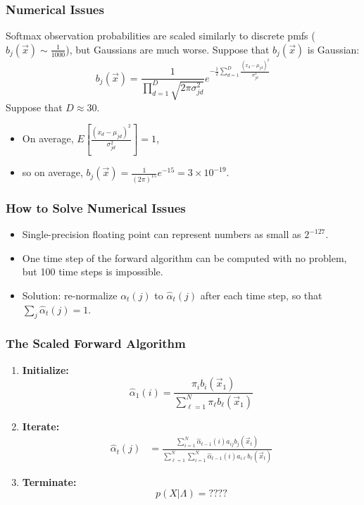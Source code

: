 \documentclass{beamer}
\begin{document}
\begin{frame}
  \frametitle{Numerical Issues}

  Softmax observation probabilities are scaled similarly to discrete
  pmfs ($b_j(\vec{x})\sim\frac{1}{1000}$), but Gaussians are much
  worse. Suppose that $b_j(\vec{x})$ is Gaussian:
  \begin{displaymath}
    b_j(\vec{x})=
    \frac{1}{\prod_{d=1}^D\sqrt{2\pi\sigma_{jd}^2}}e^{-\frac{1}{2}\sum_{d=1}^D\frac{(x_d-\mu_{jd})^2}{\sigma_{jd}^2}}
  \end{displaymath}
  Suppose that $D\approx 30$.
  \begin{itemize}
  \item On average, $E\left[\frac{(x_d-\mu_{jd})^2}{\sigma_{jd}^2}\right]=1$,
  \item so  on average, $b_j(\vec{x})=\frac{1}{(2\pi)^{15}}e^{-15}=3\times 10^{-19}$.
  \end{itemize}
\end{frame}

\begin{frame}
  \frametitle{How to Solve Numerical Issues}

  \begin{itemize}
  \item Single-precision floating point can represent numbers as small
    as $2^{-127}$.
  \item One time step of the forward algorithm can be computed with no
    problem, but 100 time steps is impossible.
  \item Solution: re-normalize $\alpha_t(j)$ to $\hat\alpha_t(j)$
    after each time step, so that $\sum_j\hat\alpha_t(j)=1$.
  \end{itemize}
\end{frame}

\begin{frame}
  \frametitle{The Scaled Forward Algorithm}

  \begin{enumerate}
  \item {\bf Initialize:}
    \[
    \hat\alpha_1(i) = \frac{\pi_i b_i(\vec{x}_1)}{\sum_{\ell=1}^N\pi_\ell b_\ell(\vec{x}_1)}
    \]
  \item {\bf Iterate:}
    \begin{align*}
      \hat\alpha_{t}(j) &=
      \frac{\sum_{i=1}^N \hat\alpha_{t-1}(i) a_{ij}b_j(\vec{x}_t)}
      {\sum_{\ell=1}^N\sum_{i=1}^N \hat\alpha_{t-1}(i) a_{i\ell}b_\ell(\vec{x}_t)}
    \end{align*}
  \item {\bf Terminate:}
    \[
    p(X|\Lambda) = ????
    \]
  \end{enumerate}
\end{frame}
\end{document}
